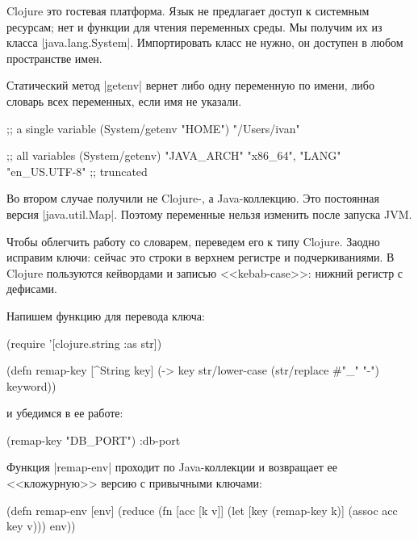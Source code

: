Clojure это гостевая платформа. Язык не предлагает доступ к системным ресурсам;
нет и функции для чтения переменных среды. Мы получим их из класса
\spverb|java.lang.System|. Импортировать класс не нужно, он доступен в любом
пространстве имен.

Статический метод \spverb|getenv| вернет либо одну переменную по имени, либо
словарь всех переменных, если имя не указали.

\begin{english}
  \begin{clojure}
;; a single variable
(System/getenv "HOME")
"/Users/ivan"

;; all variables
(System/getenv)
{"JAVA_ARCH" "x86_64", "LANG" "en_US.UTF-8"} ;; truncated
  \end{clojure}
\end{english}

Во втором случае получили не Clojure-, а Java-коллекцию. Это постоянная версия
\spverb|java.util.Map|. Поэтому переменные нельзя изменить после запуска JVM.

Чтобы облегчить работу со словарем, переведем его к типу Clojure. Заодно
исправим ключи: сейчас это строки в верхнем регистре и подчеркиваниями. В
Clojure пользуются кейвордами и записью <<kebab-case>>: нижний регистр с
дефисами.

Напишем функцию для перевода ключа:

\begin{english}
  \begin{clojure}
(require '[clojure.string :as str])

(defn remap-key [^String key]
  (-> key
      str/lower-case
      (str/replace #"_" "-")
      keyword))
  \end{clojure}
\end{english}

\noindent
и убедимся в ее работе:

\begin{english}
  \begin{clojure}
(remap-key "DB_PORT")
:db-port
  \end{clojure}
\end{english}

Функция \spverb|remap-env| проходит по Java-коллекции и возвращает ее
<<кложурную>> версию с привычными ключами:

\begin{english}
  \begin{clojure}
(defn remap-env [env]
  (reduce
   (fn [acc [k v]]
     (let [key (remap-key k)]
       (assoc acc key v)))
   {}
   env))
  \end{clojure}
\end{english}

